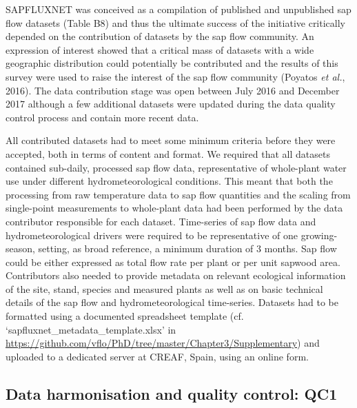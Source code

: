 \documentclass[11pt,twoside]{reedthesis}
\begin{document}
SAPFLUXNET was conceived as a compilation of published and unpublished
sap flow datasets (Table B8) and thus the ultimate success of the
initiative critically depended on the contribution of datasets by the
sap flow community. An expression of interest showed that a critical
mass of datasets with a wide geographic distribution could potentially
be contributed and the results of this survey were used to raise the
interest of the sap flow community (Poyatos \emph{et al.}, 2016). The
data contribution stage was open between July 2016 and December 2017
although a few additional datasets were updated during the data quality
control process and contain more recent data. \par

All contributed datasets had to meet some minimum criteria before they
were accepted, both in terms of content and format. We required that all
datasets contained sub-daily, processed sap flow data, representative of
whole-plant water use under different hydrometeorological conditions.
This meant that both the processing from raw temperature data to sap
flow quantities and the scaling from single-point measurements to
whole-plant data had been performed by the data contributor responsible
for each dataset. Time-series of sap flow data and hydrometeorological
drivers were required to be representative of one growing-season,
setting, as broad reference, a minimum duration of 3 months. Sap flow
could be either expressed as total flow rate per plant or per unit
sapwood area. Contributors also needed to provide metadata on relevant
ecological information of the site, stand, species and measured plants
as well as on basic technical details of the sap flow and
hydrometeorological time-series. Datasets had to be formatted using a
documented spreadsheet template (cf.
`sapfluxnet\_metadata\_template.xlsx' in
\url{https://github.com/vflo/PhD/tree/master/Chapter3/Supplementary})
and uploaded to a dedicated server at CREAF, Spain, using an online
form.\par

\subsection{Data harmonisation and quality control:
QC1}\label{data-harmonisation-and-quality-control-qc1}
\end{document}

